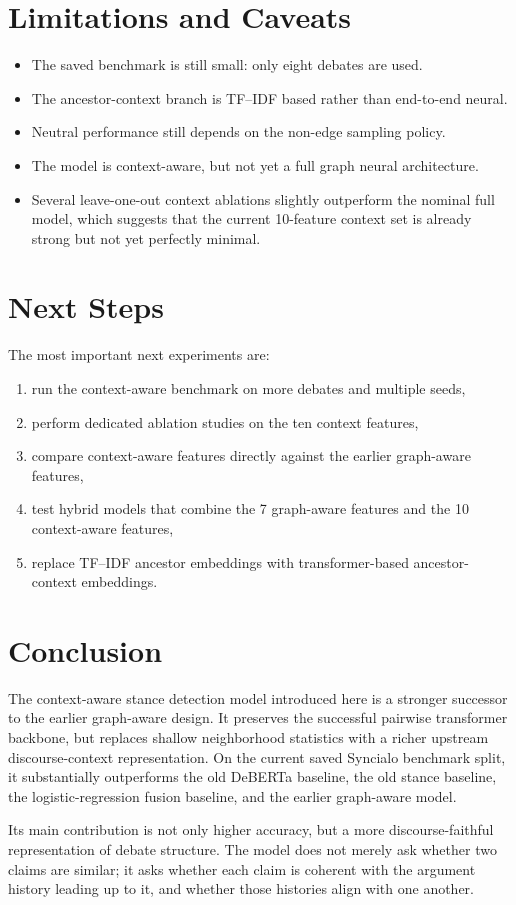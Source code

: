 \documentclass[11pt,a4paper]{article}
\begin{document}
\section{Limitations and Caveats}
\begin{itemize}[leftmargin=1.5em]
  \item The saved benchmark is still small: only eight debates are used.
  \item The ancestor-context branch is TF--IDF based rather than end-to-end neural.
  \item Neutral performance still depends on the non-edge sampling policy.
  \item The model is context-aware, but not yet a full graph neural architecture.
  \item Several leave-one-out context ablations slightly outperform the nominal full model, which suggests that the current 10-feature context set is already strong but not yet perfectly minimal.
\end{itemize}

\section{Next Steps}
The most important next experiments are:
\begin{enumerate}[label=\arabic*.]
  \item run the context-aware benchmark on more debates and multiple seeds,
  \item perform dedicated ablation studies on the ten context features,
  \item compare context-aware features directly against the earlier graph-aware features,
  \item test hybrid models that combine the 7 graph-aware features and the 10 context-aware features,
  \item replace TF--IDF ancestor embeddings with transformer-based ancestor-context embeddings.
\end{enumerate}

\section{Conclusion}
The context-aware stance detection model introduced here is a stronger successor to the earlier graph-aware design. It preserves the successful pairwise transformer backbone, but replaces shallow neighborhood statistics with a richer upstream discourse-context representation. On the current saved Syncialo benchmark split, it substantially outperforms the old DeBERTa baseline, the old stance baseline, the logistic-regression fusion baseline, and the earlier graph-aware model.

Its main contribution is not only higher accuracy, but a more discourse-faithful representation of debate structure. The model does not merely ask whether two claims are similar; it asks whether each claim is coherent with the argument history leading up to it, and whether those histories align with one another.
\end{document}
